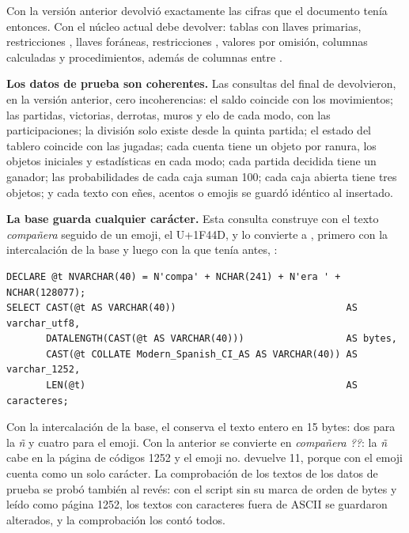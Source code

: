 Con la versión anterior devolvió exactamente las cifras que el documento tenía entonces. Con el núcleo actual debe devolver: \bdNumTablas{} tablas con \bdNumTablas{} llaves primarias, \bdNumUnicas{} restricciones , \bdNumForaneas{} llaves foráneas, \bdNumChecks{} restricciones , \bdNumOmision{} valores por omisión, \bdNumCalculadas{} columnas calculadas y \bdNumProcedimientos{} procedimientos, además de \bdNumNoNulas{} columnas  entre \bdNumColumnas{}.

\textbf{Los datos de prueba son coherentes.} Las consultas del final de  devolvieron, en la versión anterior, cero incoherencias: el saldo coincide con los movimientos; las partidas, victorias, derrotas, muros y elo de cada modo, con las participaciones; la división solo existe desde la quinta partida; el estado del tablero coincide con las jugadas; cada cuenta tiene un objeto por ranura, los objetos iniciales y estadísticas en cada modo; cada partida decidida tiene un ganador; las probabilidades de cada caja suman 100; cada caja abierta tiene tres objetos; y cada texto con eñes, acentos o emojis se guardó idéntico al insertado.

\textbf{La base guarda cualquier carácter.} Esta consulta construye con  el texto \textit{compañera} seguido de un emoji, el U+1F44D, y lo convierte a , primero con la intercalación de la base y luego con la que tenía antes, :

\begin{lstlisting}[style=sql, basicstyle=\ttfamily\footnotesize]
DECLARE @t NVARCHAR(40) = N'compa' + NCHAR(241) + N'era ' + NCHAR(128077);
SELECT CAST(@t AS VARCHAR(40))                              AS varchar_utf8,
       DATALENGTH(CAST(@t AS VARCHAR(40)))                  AS bytes,
       CAST(@t COLLATE Modern_Spanish_CI_AS AS VARCHAR(40)) AS varchar_1252,
       LEN(@t)                                              AS caracteres;
\end{lstlisting}

Con la intercalación de la base, el  conserva el texto entero en 15 bytes: dos para la \textit{ñ} y cuatro para el emoji. Con la anterior se convierte en \textit{compañera ??}: la \textit{ñ} cabe en la página de códigos 1252 y el emoji no.  devuelve 11, porque con  el emoji cuenta como un solo carácter. La comprobación de los textos de los datos de prueba se probó también al revés: con el script sin su marca de orden de bytes y leído como página 1252, los \dpNumTextosUnicode{} textos con caracteres fuera de ASCII se guardaron alterados, y la comprobación los contó todos.


